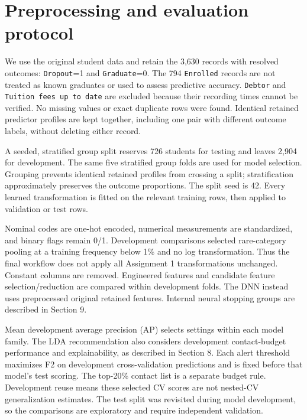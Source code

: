 \section{Preprocessing and evaluation protocol}
\label{sec:shared-protocol}

We use the original student data and retain the 3,630 records with resolved
outcomes: \texttt{Dropout}=1 and \texttt{Graduate}=0. The 794 \texttt{Enrolled}
records are not treated as known graduates or used to assess predictive accuracy.
\texttt{Debtor} and \texttt{Tuition fees up to date} are excluded because their
recording times cannot be verified. No missing values or exact duplicate rows
were found. Identical retained predictor profiles are kept together, including
one pair with different outcome labels, without deleting either record.

A seeded, stratified group split reserves 726 students for testing and leaves
2,904 for development. The same five stratified group folds are used for model
selection. Grouping prevents identical retained profiles from crossing a split;
stratification approximately preserves the outcome proportions. The split seed
is 42. Every learned transformation is fitted on the relevant training rows,
then applied to validation or test rows.

Nominal codes are one-hot encoded, numerical measurements are standardized,
and binary flags remain 0/1. Development comparisons selected rare-category
pooling at a training frequency below 1\% and no log transformation. Thus the
final workflow does not apply all Assignment 1 transformations unchanged.
Constant columns are removed. Engineered features and candidate feature
selection/reduction are compared within development folds. The DNN instead uses
preprocessed original retained features. Internal neural stopping groups are
described in Section 9.

Mean development average precision (AP) selects settings within each model
family. The LDA recommendation also considers development contact-budget
performance and explainability, as described in Section 8. Each alert threshold
maximizes F2 on development cross-validation predictions and is fixed before
that model's test scoring. The top-20\% contact list is a separate budget rule.
Development reuse means these selected CV scores are not nested-CV
generalization estimates. The test split was revisited during model development,
so the comparisons are exploratory and require independent validation.
